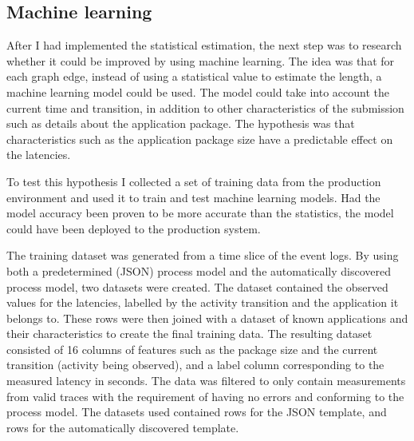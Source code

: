 

\subsection{Machine learning}
\label{sec:ml-estimation}

After I had implemented the statistical estimation, the next step was to research whether it could be improved by using machine learning. 
The idea was that for each graph edge, instead of using a statistical value to estimate the length, a machine learning model could be used.
The model could take into account the current time and transition, in addition to other characteristics of the submission such as details about the application package.
The hypothesis was that characteristics such as the application package size have a predictable effect on the latencies.

To test this hypothesis I collected a set of training data from the production environment and used it to train and test machine learning models.
Had the model accuracy been proven to be more accurate than the statistics, the model could have been deployed to the production system.

The training dataset was generated from a time slice of the event logs. 
By using both a predetermined (JSON) process model  and the automatically discovered process model, two datasets were created. The dataset contained the observed values for the latencies, labelled by the activity transition and the application it belongs to.
These rows were then joined with a dataset of known applications and their characteristics to create the final training data.
The resulting dataset consisted of 16 columns of features such as the package size and the current transition (activity being observed), and a label column corresponding to the measured latency in seconds. 
The data was filtered to only contain measurements from valid traces with the requirement of having no errors and conforming to the process model.
The datasets used contained  rows for the JSON template, and  rows for the automatically discovered template.


